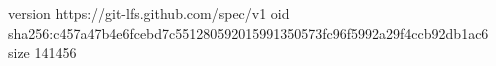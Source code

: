 version https://git-lfs.github.com/spec/v1
oid sha256:c457a47b4e6fcebd7c551280592015991350573fc96f5992a29f4ccb92db1ac6
size 141456
